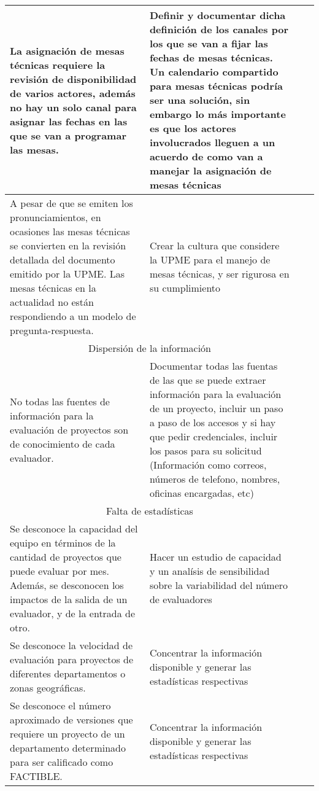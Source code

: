 \documentclass{article}
\begin{document}
\begin{landscape}
\begin{longtable}{ |p{12cm}|p{8cm}|p{2cm}|p{2cm}|}
La asignación de mesas técnicas requiere la revisión de disponibilidad de varios actores, además no hay un solo canal para asignar las fechas en las que se van a programar las mesas. & Definir y documentar dicha definición de los canales por los que se van a fijar las fechas de mesas técnicas. Un calendario compartido para mesas técnicas podría ser una solución, sin embargo lo más importante es que los actores involucrados lleguen a un acuerdo de como van a manejar la asignación de mesas técnicas & & \\\hline

A pesar de que se emiten los pronunciamientos, en ocasiones las mesas técnicas se convierten en la revisión detallada del documento emitido por la UPME. Las mesas técnicas en la actualidad no están respondiendo a un modelo de pregunta-respuesta. & Crear la cultura que considere la UPME para el manejo de mesas técnicas, y ser rigurosa en su cumplimiento & & \\\hline

\multicolumn{2}{|c|}{Dispersión de la información} & & \\\hline

No todas las fuentes de información para la evaluación de proyectos son de conocimiento de cada evaluador. & Documentar todas las fuentas de las que se puede extraer información para la evaluación de un proyecto, incluir un paso a paso de los accesos y si hay que pedir credenciales, incluir los pasos para su solicitud (Información como correos, números de telefono, nombres, oficinas encargadas, etc) & & \\\hline

\multicolumn{2}{|c|}{Falta de estadísticas} & & \\\hline

Se desconoce la capacidad del equipo en términos de la cantidad de proyectos que puede evaluar por mes. Además, se desconocen los impactos de la salida de un evaluador, y de la entrada de otro. & Hacer un estudio de capacidad y un analísis de sensibilidad sobre la variabilidad del número de evaluadores & & \\\hline

Se desconoce la velocidad de evaluación para proyectos de diferentes departamentos o zonas geográficas. & Concentrar la información disponible y generar las estadísticas respectivas & & \\\hline

Se desconoce el número aproximado de versiones que requiere un proyecto de un departamento determinado para ser calificado como FACTIBLE. & Concentrar la información disponible y generar las estadísticas respectivas & & \\\hline


\end{longtable}
\end{landscape}
\end{document}
